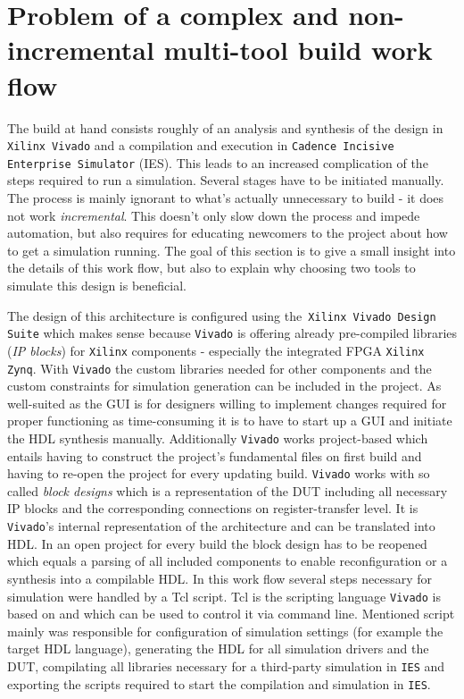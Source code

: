 
\chapter{Problem of a complex and non-incremental multi-tool build work flow}


The build at hand consists roughly of an analysis and synthesis of the design in \texttt{Xilinx Vivado} and a compilation and execution in \texttt{Cadence Incisive Enterprise Simulator} (IES). This leads to an increased complication of the steps required to run a simulation. Several stages have to be initiated manually. The process is mainly ignorant to what's actually unnecessary to build - it does not work \textit{incremental}. This doesn't only slow down the process and impede automation, but also requires for educating newcomers to the project about how to get a simulation running. The goal of this section is to give a small insight into the details of this work flow, but also to explain why choosing two tools to simulate this design is beneficial.

The design of this architecture is configured using the\texttt{ Xilinx Vivado Design Suite} which makes sense because \texttt{Vivado} is offering already pre-compiled libraries (\textit{\acs{IP} blocks}) for \texttt{Xilinx} components - especially the integrated \acs{FPGA} \texttt{Xilinx Zynq}. With \texttt{Vivado} the custom libraries needed for other components and the custom constraints for simulation generation can be included in the project. As well-suited as the \acs{GUI} is for designers willing to implement changes required for proper functioning as time-consuming it is to have to start up a \acs{GUI} and initiate the \acs{HDL} synthesis manually. Additionally \texttt{Vivado} works project-based which entails having to construct the project's fundamental files on first build and having to re-open the project for every updating build. \texttt{Vivado} works with so called \textit{block designs} which is a representation of the \acs{DUT} including all necessary \acs{IP} blocks and the corresponding connections on register-transfer level. It is \texttt{Vivado}'s internal representation of the architecture and can be translated into \acs{HDL}. In an open project for every build the block design has to be reopened which equals a parsing of all included components to enable reconfiguration or a synthesis into a compilable \acs{HDL}. In this work flow several steps necessary for simulation were handled by a Tcl script. Tcl is the scripting language \texttt{Vivado} is based on and which can be used to control it via command line. Mentioned script mainly was responsible for configuration of simulation settings (for example the target \acs{HDL} language), generating the \acs{HDL} for all simulation drivers and the \acs{DUT}, compilating all libraries necessary for a third-party simulation in \texttt{\acs{IES}} and exporting the scripts required to start the compilation and simulation in \texttt{\acs{IES}}.

